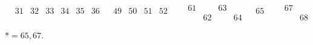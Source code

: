 \documentclass[12pt,a4paper]{amsart}
\begin{document}
\begin{align*}
\begin{array}{c|c|c|c|c|c|c}
\begin{array}{r|r|r|r|r|r}
31&32&33&34&35&36\\%
  &  &  &  &  &  \\%
\end{array}%
&
\begin{array}{r|r|r|r}%
49&50&51&52\\%
  &  &  &  \\%
\end{array}%
&&
\begin{array}{rr|rr}%
61&  &63&  \\%
  &62&  &64\\%
\end{array}%
&
\begin{array}{r}%
65\\%
  \\%
\end{array}%
&&
\begin{array}{rr}%
67&  \\%
  &68\\%
\end{array}%
\end{array}
\end{align*}
$* = 65, 67$.
\end{document}
